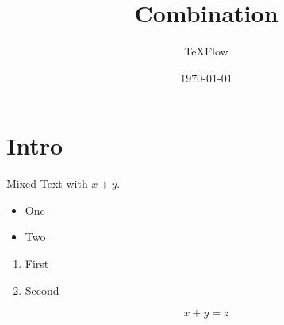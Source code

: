 \documentclass[aspectratio=43]{beamer}
\title{Combination}
\author{TeXFlow}
\date{\today}
\begin{document}
\section{Intro}
\begin{frame}{Mixed}
Text with $x+y$.
\begin{itemize}
  \item One
  \item Two
\end{itemize}
\begin{enumerate}
  \item First
  \item Second
\end{enumerate}
\begin{equation}
x+y=z
\end{equation}
\end{frame}
\end{document}
